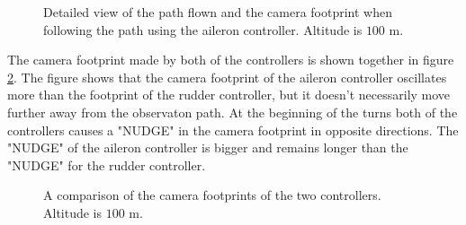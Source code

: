 \begin{figure}[]
    \centering
    \caption{Detailed view of the path flown and the camera footprint when following the path using the aileron controller. Altitude is $100$ m.}
	\label{fig:aotc_comp_hundred}
\end{figure}

The camera footprint made by both of the controllers is shown together in figure \ref{fig:ratc_aotc_comparison}. The figure shows that the camera footprint of the aileron controller oscillates more than the footprint of the rudder controller, but it doesn't necessarily move further away from the observaton path. At the beginning of the turns both of the controllers causes a "NUDGE" in the camera footprint in opposite directions. The "NUDGE" of the aileron controller is bigger and remains longer than the "NUDGE" for the rudder controller.

\begin{figure}[]
    \centering
    \caption{A comparison of the camera footprints of the two controllers. Altitude is $100$ m.}
	\label{fig:ratc_aotc_comparison}
\end{figure}


